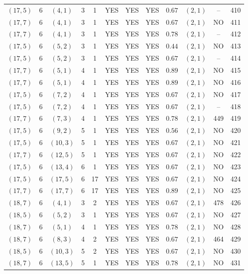 \begin{longtable}{|c|c|c|c|c|c|c|c|c|c|c|c|}
$(17,5)$ & 6 & $(4,1)$ & 3 & 1 & YES & YES & YES & $0.67$ & $(2,1)$ & -- & 410\\
$(17,7)$ & 6 & $(4,1)$ & 3 & 1 & YES & YES & YES & $0.67$ & $(2,1)$ & NO & 411\\
$(17,7)$ & 6 & $(4,1)$ & 3 & 1 & YES & YES & YES & $0.78$ & $(2,1)$ & -- & 412\\
$(17,5)$ & 6 & $(5,2)$ & 3 & 1 & YES & YES & YES & $0.44$ & $(2,1)$ & NO & 413\\
$(17,5)$ & 6 & $(5,2)$ & 3 & 1 & YES & YES & YES & $0.67$ & $(2,1)$ & -- & 414\\
$(17,7)$ & 6 & $(5,1)$ & 4 & 1 & YES & YES & YES & $0.89$ & $(2,1)$ & NO & 415\\
$(17,7)$ & 6 & $(5,1)$ & 4 & 1 & YES & YES & YES & $0.89$ & $(2,1)$ & NO & 416\\
$(17,5)$ & 6 & $(7,2)$ & 4 & 1 & YES & YES & YES & $0.67$ & $(2,1)$ & NO & 417\\
$(17,5)$ & 6 & $(7,2)$ & 4 & 1 & YES & YES & YES & $0.67$ & $(2,1)$ & -- & 418\\
$(17,7)$ & 6 & $(7,3)$ & 4 & 1 & YES & YES & YES & $0.78$ & $(2,1)$ & 449 & 419\\
$(17,5)$ & 6 & $(9,2)$ & 5 & 1 & YES & YES & YES & $0.56$ & $(2,1)$ & NO & 420\\
$(17,5)$ & 6 & $(10,3)$ & 5 & 1 & YES & YES & YES & $0.67$ & $(2,1)$ & NO & 421\\
$(17,7)$ & 6 & $(12,5)$ & 5 & 1 & YES & YES & YES & $0.67$ & $(2,1)$ & NO & 422\\
$(17,5)$ & 6 & $(13,4)$ & 6 & 1 & YES & YES & YES & $0.67$ & $(2,1)$ & NO & 423\\
$(17,5)$ & 6 & $(17,5)$ & 6 & 17 & YES & YES & YES & $0.67$ & $(2,1)$ & NO & 424\\
$(17,7)$ & 6 & $(17,7)$ & 6 & 17 & YES & YES & YES & $0.89$ & $(2,1)$ & NO & 425\\
$(18,7)$ & 6 & $(4,1)$ & 3 & 2 & YES & YES & YES & $0.67$ & $(2,1)$ & 478 & 426\\
$(18,5)$ & 6 & $(5,2)$ & 3 & 1 & YES & YES & YES & $0.67$ & $(2,1)$ & NO & 427\\
$(18,7)$ & 6 & $(5,1)$ & 4 & 1 & YES & YES & YES & $0.78$ & $(2,1)$ & NO & 428\\
$(18,7)$ & 6 & $(8,3)$ & 4 & 2 & YES & YES & YES & $0.67$ & $(2,1)$ & 464 & 429\\
$(18,5)$ & 6 & $(10,3)$ & 5 & 2 & YES & YES & YES & $0.67$ & $(2,1)$ & NO & 430\\
$(18,7)$ & 6 & $(13,5)$ & 5 & 1 & YES & YES & YES & $0.78$ & $(2,1)$ & NO & 431\\

\end{longtable}
